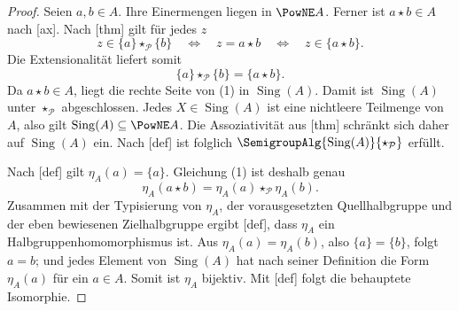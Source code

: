 \documentclass[main.tex]{subfiles}
\begin{document}
\begin{proof}
Seien \(a,b\in A\). Ihre Einermengen liegen in \(\PowNE A\). Ferner ist
\(a\star b\in A\) nach [ax]. Nach
[thm] gilt für jedes \(z\)
\[
  z\in\{a\}\star_{\mathcal P}\{b\}
  \quad\Longleftrightarrow\quad
  z=a\star b
  \quad\Longleftrightarrow\quad
  z\in\{a\star b\}.
\]
Die Extensionalität liefert somit
\[
  \{a\}\star_{\mathcal P}\{b\}=\{a\star b\}.       \tag{1}
\]
Da \(a\star b\in A\), liegt die rechte Seite von (1) in
\(\operatorname{Sing}(A)\). Damit ist
\(\operatorname{Sing}(A)\) unter \(\star_{\mathcal P}\) abgeschlossen.
Jedes \(X\in\operatorname{Sing}(A)\) ist eine nichtleere Teilmenge von
\(A\), also gilt \(\operatorname{Sing}(A)\subseteq\PowNE A\). Die
Assoziativität aus [thm] schränkt sich
daher auf \(\operatorname{Sing}(A)\) ein. Nach
[def] ist folglich
\(\SemigroupAlg{\operatorname{Sing}(A)}{\star_{\mathcal P}}\) erfüllt.

Nach [def] gilt
\(\eta_A(a)=\{a\}\). Gleichung (1) ist deshalb genau
\[
  \eta_A(a\star b)
   =\eta_A(a)\star_{\mathcal P}\eta_A(b).
\]
Zusammen mit der Typisierung von \(\eta_A\), der vorausgesetzten
Quellhalbgruppe und der eben bewiesenen Zielhalbgruppe ergibt
[def], dass \(\eta_A\) ein
Halbgruppenhomomorphismus ist. Aus \(\eta_A(a)=\eta_A(b)\), also
\(\{a\}=\{b\}\), folgt \(a=b\); und jedes Element von
\(\operatorname{Sing}(A)\) hat nach seiner Definition die Form \(\eta_A(a)\)
für ein \(a\in A\). Somit ist \(\eta_A\) bijektiv. Mit
[def] folgt die behauptete Isomorphie.
\end{proof}
\end{document}
